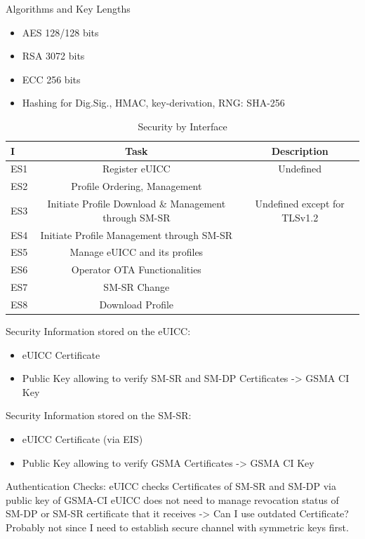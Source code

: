 \begin{table}[htpb]
\begin{tabular}{m{9em}|m{.75cm}|m{.75cm}||m{.75cm}|m{.75cm}|m{.75cm}|m{.75cm}||m{1.8cm}|m{.75cm}}
     
\end{tabular}
\end{table}

Algorithms and Key Lengths
\begin{itemize}
    \item AES 128/128 bits
    \item RSA 3072 bits
    \item ECC 256 bits
    \item Hashing for Dig.Sig., HMAC, key-derivation, RNG: SHA-256
\end{itemize}


\begin{table}[htpb]
    \caption[M2M Security by Interface]{Security by Interface}\label{tab:M2MInt}
    \centering
    \begin{tabular}{m{.75cm}|c|c}
         I & Task & Description \\ \hline
         ES1 & Register eUICC & Undefined \\
         ES2 & Profile Ordering, Management & \\
         ES3 & Initiate Profile Download \& Management through SM-SR & Undefined except for TLSv1.2\\
         ES4 & Initiate Profile Management through SM-SR & \\
         ES5 & Manage eUICC and its profiles & \\
         ES6 & Operator OTA Functionalities & \\
         ES7 & SM-SR Change & \\
         ES8 & Download Profile & \\
    \end{tabular}
\end{table}

Security Information stored on the eUICC:
\begin{itemize}
    \item eUICC Certificate
    \item Public Key allowing to verify SM-SR and SM-DP Certificates -> GSMA CI Key
\end{itemize}
Security Information stored on the SM-SR:
\begin{itemize}
    \item eUICC Certificate (via EIS)
    \item Public Key allowing to verify GSMA Certificates -> GSMA CI Key
\end{itemize}
Authentication Checks: eUICC checks Certificates of SM-SR and SM-DP via public key of GSMA-CI
    eUICC does not need to manage revocation status of SM-DP or SM-SR certificate that it receives -> Can I use outdated Certificate? Probably not since I need to establish secure channel with symmetric keys first.

